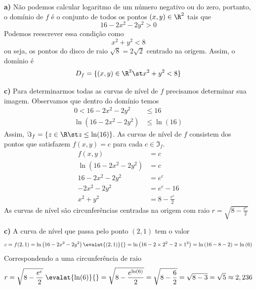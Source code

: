 \documentclass[a4paper,12pt,fleqn]{article}
\begin{document}
\begin{answer}
\textbf{a)} \quad
  Não podemos calcular logaritmo de um número negativo ou do zero,
  portanto, o domínio de $f$ é o conjunto
  de todos os pontos \((x, y)\in\R^2\) tais que
  \[
    16-2x^2-2y^2 > 0
  \]
  Podemos reescrever essa condição como
  \[
    x^2 + y^2 < 8
  \]
  ou seja, os pontos do disco de raio $\sqrt{8}=2\sqrt{2}$ centrado na origem.
  Assim, o domínio é
  \[
    D_f = \{(x, y) \in \R^2 \st x^2 + y^2 < 8\}
  \]

\bigskip
\textbf{c)} \quad
  Para determinarmos todas as curvas de nível de $f$ precisamos determinar sua
  imagem. Observamos que dentro do domínio temos
  \begin{align*}
    0 < 16-2x^2-2y^2             & \leq 16      \\[2mm]
    \ln\left(16-2x^2-2y^2\right) & \leq \ln(16)
  \end{align*}
  Assim, \(\Im_f = \left\{z\in\R \st z \leq \ln(16)\right\}\).
  As curvas de nível de $f$ consistem dos pontos que satisfazem
  \(
    f(x, y) = c
  \)
  para cada \(c\in\Im_f\).
  \begin{align*}
    f(x, y)                      & = c                 \\[2mm]
    \ln\left(16-2x^2-2y^2\right) & = c                 \\[2mm]
    16-2x^2-2y^2                 & = e^c               \\[2mm]
    - 2x^2 - 2y^2                & = e^c - 16          \\[2mm]
    x^2 + y^2                    & = 8 - \frac{e^c}{2}
  \end{align*}
  As curvas de nível são circunferências centradas na origem com raio
  \(
    r = \sqrt{8 - \frac{e^c}{2}}
  \)

\bigskip
\textbf{c)} \quad
A curva de nível que passa pelo ponto $(2, 1)$ tem o valor
\[
  c
  = f(2, 1)
  = \ln\left(16-2x^2-2y^2\right) \evalat{(2, 1)}{}
  = \ln\left(16-2\times 2^2 - 2\times 1^2\right)
  = \ln\left(16 - 8 - 2\right)
  = \ln\left(6\right)
\]
Correspondendo a uma circunferência de raio
\[
  r
  = \sqrt{8 - \frac{e^c}{2}} \; \evalat{\ln(6)}{}
  = \sqrt{8 - \frac{e^{\ln(6)}}{2}}
  = \sqrt{8 - \frac{6}{2}}
  = \sqrt{8 - 3}
  = \sqrt{5}
  \approx 2,236
\]

\end{answer}

\end{document}
